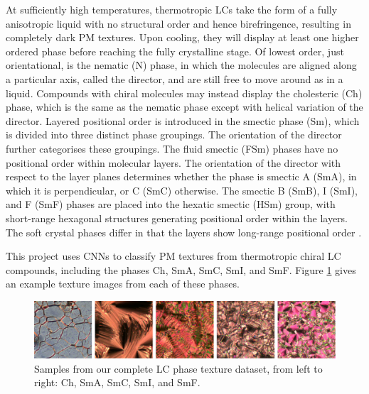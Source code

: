 \documentclass[12pt]{article}
\begin{document}
At sufficiently high temperatures, thermotropic LCs take the form of a fully anisotropic liquid with no structural order and hence birefringence, resulting in completely dark PM textures. Upon cooling, they will display at least one higher ordered phase before reaching the fully crystalline stage. Of lowest order, just orientational, is the nematic (N) phase, in which the molecules are aligned along a particular axis, called the director, and are still free to move around as in a liquid. Compounds with chiral molecules may instead display the cholesteric (Ch) phase, which is the same as the nematic phase except with helical variation of the director. Layered positional order is introduced in the smectic phase (Sm), which is divided into three distinct phase groupings. The orientation of the director further categorises these groupings. The fluid smectic (FSm) phases have no positional order within molecular layers. The orientation of the director with respect to the layer planes determines whether the phase is smectic A (SmA), in which it is perpendicular, or C (SmC) otherwise. The smectic B (SmB), I (SmI), and F (SmF) phases are placed into the hexatic smectic (HSm) group, with short-range hexagonal structures generating positional order within the layers. The soft crystal phases differ in that the layers show long-range positional order \cite{Dierking03}.

This project uses CNNs to classify PM textures from thermotropic chiral LC compounds, including the phases Ch, SmA, SmC, SmI, and SmF. Figure \ref{textures} gives an example texture images from each of these phases.
\begin{figure}[!h]
\centering
\includegraphics[width=\textwidth]{images/textures.png}
\caption{Samples from our complete LC phase texture dataset, from left to right: Ch, SmA, SmC, SmI, and SmF.}
\label{textures}
\end{figure}  
\end{document}
